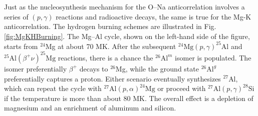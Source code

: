 
Just as the nucleosynthesis mechanism for the O--Na anticorrelation involves a series of $(p,\gamma)$ reactions and radioactive decays, the same is true for the Mg-K anticorrelation. The hydrogen burning schemes are illustrated in Fig. \ref{fig:MgKHBurning}. The Mg--Al cycle, shown on the left-hand side of the figure, starts from $^{24}$Mg at about 70 MK. After the subsequent $^{24}\mathrm{Mg}(p,\gamma)^{25}\mathrm{Al}$ and $^{25}\mathrm{Al}(\beta^{+}\nu)^{25}\mathrm{Mg}$ reactions, there is a chance the $^{26}\mathrm{Al}^{m}$ isomer is populated. The isomer preferentially $\beta^{+}$ decays to $^{26}$Mg, while the ground state $^{26}\mathrm{Al}^{g}$ preferentially captures a proton. Either scenario eventually synthesizes $^{27}$Al, which can repeat the cycle with $^{27}\mathrm{Al}(p,\alpha)^{24}\mathrm{Mg}$ or proceed with $^{27}\mathrm{Al}(p,\gamma)^{28}\mathrm{Si}$ if the temperature is more than about 80 MK. The overall effect is a depletion of magnesium and an enrichment of aluminum and silicon.

